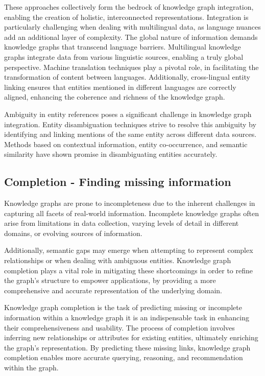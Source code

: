 These approaches collectively form the bedrock of knowledge graph integration, enabling the creation of holistic, interconnected representations. Integration is particularly challenging when dealing with multilingual data, as language nuances add an additional layer of complexity. The global nature of information demands knowledge graphs that transcend language barriers. Multilingual knowledge graphs integrate data from various linguistic sources, enabling a truly global perspective. Machine translation techniques play a pivotal role, in facilitating the transformation of content between languages. Additionally, cross-lingual entity linking ensures that entities mentioned in different languages are correctly aligned, enhancing the coherence and richness of the knowledge graph.

Ambiguity in entity references poses a significant challenge in knowledge graph integration. Entity disambiguation techniques strive to resolve this ambiguity by identifying and linking mentions of the same entity across different data sources. Methods based on contextual information, entity co-occurrence, and semantic similarity have shown promise in disambiguating entities accurately.

\subsection{Completion - Finding missing information}

Knowledge graphs are prone to incompleteness due to the inherent challenges in capturing all facets of real-world information. Incomplete knowledge graphs often arise from limitations in data collection, varying levels of detail in different domains, or evolving sources of information. 

Additionally, semantic gaps may emerge when attempting to represent complex relationships or when dealing with ambiguous entities. Knowledge graph completion plays a vital role in mitigating these shortcomings in order to refine the graph's structure to empower applications, by providing a more comprehensive and accurate representation of the underlying domain.

Knowledge graph completion is the task of predicting missing or incomplete information within a knowledge graph it is an indispensable task in enhancing their comprehensiveness and usability. The process of completion involves inferring new relationships or attributes for existing entities, ultimately enriching the graph's representation. By predicting these missing links, knowledge graph completion enables more accurate querying, reasoning, and recommendation within the graph. 


